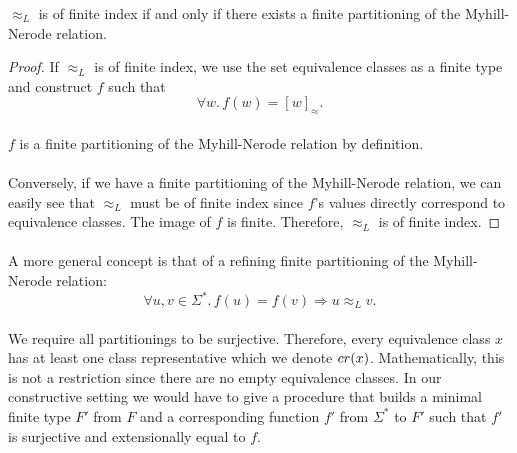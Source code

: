 
\begin{theorem}
    $\approx_L$ is of finite index if and only if there exists a finite partitioning of the Myhill-Nerode relation.
\end{theorem}

\begin{proof}
    If $\approx_L$ is of finite index, we use the set equivalence classes as a finite type and construct $f$ such that
    \begin{equation*}
        \forall w.\, f(w) = [w]_\approx.
    \end{equation*}
    \paragraph{}
    $f$ is a finite partitioning of the Myhill-Nerode relation by definition.

    \paragraph{}
    Conversely, if we have a finite partitioning of the Myhill-Nerode relation, we can easily see that $\approx_L$ must be of finite index since $f$'s values directly correspond to equivalence classes. The image of $f$ is finite. Therefore, $\approx_L$ is of finite index.
\end{proof}

\paragraph{}

A more general concept is that of a refining finite partitioning of the Myhill-Nerode relation:
\begin{equation*}
    \forall u, v \in \Sigma^*. \,
    f(u) = f(v) \Rightarrow u \approx_L v.
\end{equation*}




\paragraph{}
We require all partitionings to be surjective.
Therefore, every equivalence class $x$ has at least one class representative which we denote $cr(x)$.
Mathematically, this is not a restriction since there are no empty equivalence classes.
In our constructive setting we would have to give a procedure that builds a minimal finite type $F'$ from $F$ and a corresponding function $f'$ from $\Sigma^*$ to $F'$ such that $f'$ is surjective and extensionally equal to $f$.

